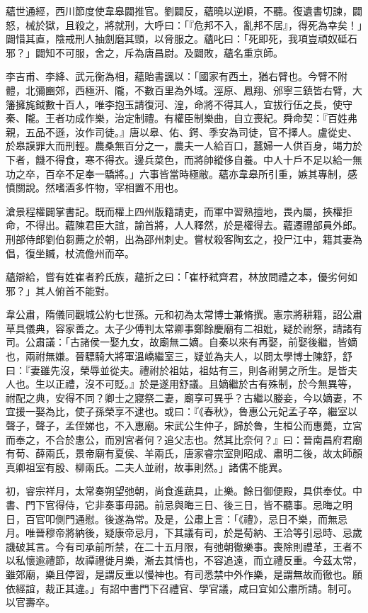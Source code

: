 \begin{pinyinscope}
 蘊世通經，西川節度使韋皋闢推官。劉闢反，蘊曉以逆順，不聽。復遺書切諫，闢怒，械於獄，且殺之，將就刑，大呼曰：「『危邦不入，亂邦不居』，得死為幸矣！」闢惜其直，陰戒刑人抽劍磨其頸，以脅服之。蘊叱曰：「死即死，我項豈頑奴砥石邪？」闢知不可服，舍之，斥為唐昌尉。及闢敗，蘊名重京師。



 李吉甫、李絳、武元衡為相，蘊貽書諷以：「國家有西土，猶右臂也。今臂不附體，北彌豳郊，西極汧、隴，不數百里為外域。涇原、鳳翔、邠寧三鎮皆右臂，大籓擁旄鉞數十百人，唯李抱玉請復河、湟，命將不得其人，宜拔行伍之長，使守秦、隴。王者功成作樂，治定制禮。有權臣制樂曲，自立喪紀。舜命契：『百姓弗親，五品不遜，汝作司徒。』唐以皋、佑、鍔、季安為司徒，官不擇人。盧從史、於皋謨罪大而刑輕。農桑無百分之一，農夫一人給百口，蠶婦一人供百身，竭力於下者，饑不得食，寒不得衣。邊兵菜色，而將帥縱侈自養。中人十戶不足以給一無功之卒，百卒不足奉一驕將。」六事皆當時極敝。蘊亦韋皋所引重，嫉其專制，感憤關說。然嗜酒多忤物，宰相置不用也。



 滄景程權闢掌書記。既而權上四州版籍請吏，而軍中習熟擅地，畏內屬，挾權拒命，不得出。蘊陳君臣大誼，諭首將，人人釋然，於是權得去。蘊遷禮部員外郎。刑部侍郎劉伯芻薦之於朝，出為邵州刺史。嘗杖殺客陶玄之，投尸江中，籍其妻為倡，復坐贓，杖流儋州而卒。



 蘊辯給，嘗有姓崔者矜氏族，蘊折之曰：「崔杼弒齊君，林放問禮之本，優劣何如邪？」其人俯首不能對。



 韋公肅，隋儀同觀城公約七世孫。元和初為太常博士兼脩撰。憲宗將耕籍，詔公肅草具儀典，容家善之。太子少傅判太常卿事鄭餘慶廟有二祖妣，疑於祔祭，請諸有司。公肅議：「古諸侯一娶九女，故廟無二嫡。自秦以來有再娶，前娶後繼，皆嫡也，兩祔無嫌。晉驃騎大將軍溫嶠繼室三，疑並為夫人，以問太學博士陳舒，舒曰：『妻雖先沒，榮辱並從夫。禮祔於祖姑，祖姑有三，則各祔舅之所生。是皆夫人也。生以正禮，沒不可貶。』於是遂用舒議。且嫡繼於古有殊制，於今無異等，祔配之典，安得不同？卿士之寢祭二妻，廟享可異乎？古繼以媵妾，今以嫡妻，不宜援一娶為比，使子孫榮享不逮也。或曰：『《春秋》，魯惠公元妃孟子卒，繼室以聲子，聲子，孟侄娣也，不入惠廟。宋武公生仲子，歸於魯，生桓公而惠薨，立宮而奉之，不合於惠公，而別宮者何？追父志也。然其比奈何？』曰：晉南昌府君廟有荀、薛兩氏，景帝廟有夏侯、羊兩氏，唐家睿宗室則昭成、肅明二後，故太師顏真卿祖室有殷、柳兩氏。二夫人並祔，故事則然。」諸儒不能異。



 初，睿宗祥月，太常奏朔望弛朝，尚食進蔬具，止樂。餘日御便殿，具供奉仗。中書、門下官得侍，它非奏事毋謁。前忌與晦三日、後三日，皆不聽事。忌晦之明日，百官叩側門通慰。後遂為常。及是，公肅上言：「《禮》，忌日不樂，而無忌月。唯晉穆帝將納後，疑康帝忌月，下其議有司，於是荀納、王洽等引忌時、忌歲譏破其言。今有司承前所禁，在二十五月限，有弛朝徹樂事。喪除則禮革，王者不以私懷逾禮節，故禫禮徙月樂，漸去其情也，不容追遠，而立禮反重。今茲太常，雖郊廟，樂且停習，是謂反重以慢神也。有司悉禁中外作樂，是謂無故而徹也。願依經誼，裁正其違。」有詔中書門下召禮官、學官議，咸曰宜如公肅所請。制可。以官壽卒。




\end{pinyinscope}
